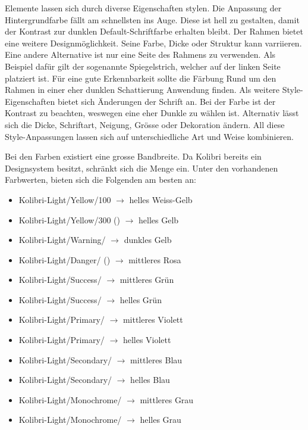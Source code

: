 Elemente lassen sich durch diverse Eigenschaften stylen. 
Die Anpassung der Hintergrundfarbe fällt am schnellsten ins Auge. 
Diese ist hell zu gestalten, damit der Kontrast zur dunklen Default-Schriftfarbe erhalten bleibt. 
Der Rahmen bietet eine weitere Designmöglichkeit. 
Seine Farbe, Dicke oder Struktur kann varriieren. 
Eine andere Alternative ist nur eine Seite des Rahmens zu verwenden. 
Als Beispiel dafür gilt der sogenannte Spiegelstrich, welcher auf der linken Seite platziert ist. 
Für eine gute Erkennbarkeit sollte die Färbung Rund um den Rahmen in einer eher dunklen Schattierung Anwendung finden. 
Als weitere Style-Eigenschaften bietet sich Änderungen der Schrift an. 
Bei der Farbe ist der Kontrast zu beachten, weswegen eine eher Dunkle zu wählen ist. 
Alternativ lässt sich die Dicke, Schriftart, Neigung, Grösse oder Dekoration ändern. 
All diese Style-Anpassungen lassen sich auf unterschiedliche Art und Weise kombinieren. 

Bei den Farben existiert eine grosse Bandbreite. 
Da Kolibri bereits ein Designsystem besitzt, schränkt sich die Menge ein. 
Unter den vorhandenen Farbwerten, bieten sich die Folgenden am besten an:

\begin{itemize}
    \item Kolibri-Light/Yellow/100 $\rightarrow$ helles Weiss-Gelb
    \item Kolibri-Light/Yellow/300 () $\rightarrow$ helles Gelb
    \item Kolibri-Light/Warning/ $\rightarrow$ dunkles Gelb
    \item Kolibri-Light/Danger/ () $\rightarrow$ mittleres Rosa
    \item Kolibri-Light/Success/ $\rightarrow$ mittleres Grün
    \item Kolibri-Light/Success/ $\rightarrow$ helles Grün
    \item Kolibri-Light/Primary/ $\rightarrow$ mittleres Violett
    \item Kolibri-Light/Primary/ $\rightarrow$ helles Violett
    \item Kolibri-Light/Secondary/ $\rightarrow$ mittleres Blau
    \item Kolibri-Light/Secondary/ $\rightarrow$ helles Blau
    \item Kolibri-Light/Monochrome/ $\rightarrow$ mittleres Grau
    \item Kolibri-Light/Monochrome/ $\rightarrow$ helles Grau
\end{itemize}

